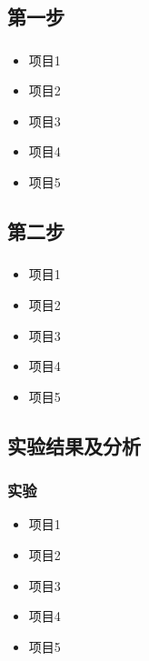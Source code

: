 \documentclass{beamer}
\begin{document}
\subsection{第一步}

\begin{frame}
  \frametitle{\subsecname}
        \begin{itemize}[<+-|alert@+>]
        \item
        项目1
        \item
        项目2
        \item
        项目3
        \item
        项目4
        \item
        项目5
        \end{itemize}
\end{frame}

\subsection{第二步}

\begin{frame}
  \frametitle{\subsecname}
        \begin{itemize}[<+-|alert@+>]
        \item
        项目1
        \item
        项目2
        \item
        项目3
        \item
        项目4
        \item
        项目5
        \end{itemize}
\end{frame}


\subsection{实验结果及分析}

\begin{frame}
  \frametitle{实验}
        \begin{itemize}[<+-|alert@+>]
        \item
        项目1
        \item
        项目2
        \item
        项目3
        \item
        项目4
        \item
        项目5
        \end{itemize}
\end{frame}
\end{document}
